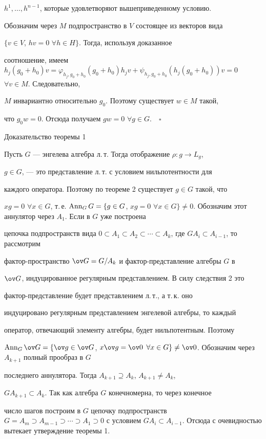 $h^1,\dotsc,h^{n-1}$, которые удовлетворяют вышеприведенному условию.  


 


Обозначим через $M$ подпространство в $V$ состоящее из векторов вида 


$\{v\in V$, $hv=0$ $\forall h\in H\}$. Тогда, используя доказанное 


соотношение, имеем $h_j(g_0+h_0)v= \varphi_{h_j,g_0+h_0}(g_0+h_0)h_j v+ 


\psi_{h_j,g_0+h_0} (h_j(g_0+h_0))v=0$ $\forall v\in M$. Следовательно, 


$M$ инвариантно относительно $g_0$. Поэтому существует $w\in M$ такой, 


что $g_0w=0$. Отсюда получаем $gw=0$ $\forall g\in G$.$\quad\square$  


 


 


\begin{pf*}{Доказательство теоремы 1} 


Пусть $G$ --- энгелева алгебра л.\,т. Тогда отображение $\rho:g\to L_g$, 


$g\in G$, --- это представление л.\,т. с условием нильпотентности для 


каждого оператора. Поэтому по теореме 2 существует $g\in G$ такой, что 


$xg=0$ $\forall x\in G$, т.\,е. $\Ann_G G=\{g\in G$, $xg=0$ $\forall x\in 


G\}\ne0$. Обозначим этот аннулятор через $A_1$. Если в $G$ уже построена 


цепочка подпространств вида $0\subset A_1\subset A_2\subset \dotsb 


\subset A_k$, где $GA_i\subset A_{i-1}$, то рассмотрим 


фактор-пространство $\ov G=G/A_k$ и фактор-представление алгебры $G$ в 


$\ov G$, индуцированное регулярным представлением. В силу следствия 2 это 


фактор-представление будет представлением л.\,т., а т.\,к. оно 


индуцировано регулярным представлением энгелевой алгебры, то каждый 


оператор, отвечающий элементу алгебры, будет нильпотентным. Поэтому 


$\Ann_G\ov G=\{\ov g\in\ov G$, $x\ov g=\ov 0$ $\forall x\in 


G\}\ne\ov 0$. Обозначим через $A_{k+1}$ полный прообраз в $G$ 


последнего аннулятора. Тогда $A_{k+1}\supseteq A_k$, $A_{k+1}\ne A_k$, 


$GA_{k+1}\subset A_k$. Так как алгебра $G$ конечномерна, то через конечное 


число шагов построим в $G$ цепочку подпространств $G=A_m\supset 


A_{m-1}\supset \dotsb \supset A_1\supset 0$ с условием $GA_i\subset 


A_{i-1}$. Отсюда с очевидностью вытекает утверждение теоремы 1.  


\end{pf*} 



